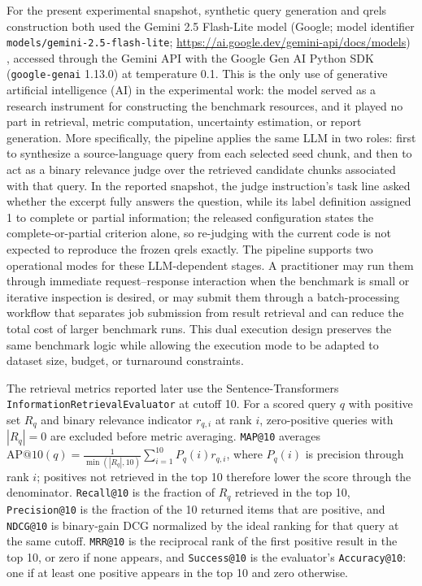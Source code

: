 For the present experimental snapshot, synthetic query generation and qrels construction both used the Gemini 2.5 Flash-Lite model (Google; model identifier \texttt{models/gemini-2.5-flash-lite}; \url{https://ai.google.dev/gemini-api/docs/models}) \citep{Google_Gemini25FlashLite}, accessed through the Gemini API with the Google Gen AI Python SDK (\texttt{google-genai} 1.13.0) at temperature 0.1. This is the only use of generative artificial intelligence (AI) in the experimental work: the model served as a research instrument for constructing the benchmark resources, and it played no part in retrieval, metric computation, uncertainty estimation, or report generation. More specifically, the pipeline applies the same LLM in two roles: first to synthesize a source-language query from each selected seed chunk, and then to act as a binary relevance judge over the retrieved candidate chunks associated with that query. In the reported snapshot, the judge instruction's task line asked whether the excerpt fully answers the question, while its label definition assigned 1 to complete or partial information; the released configuration states the complete-or-partial criterion alone, so re-judging with the current code is not expected to reproduce the frozen qrels exactly. The pipeline supports two operational modes for these LLM-dependent stages. A practitioner may run them through immediate request--response interaction when the benchmark is small or iterative inspection is desired, or may submit them through a batch-processing workflow that separates job submission from result retrieval and can reduce the total cost of larger benchmark runs. This dual execution design preserves the same benchmark logic while allowing the execution mode to be adapted to dataset size, budget, or turnaround constraints.

The retrieval metrics reported later use the Sentence-Transformers \texttt{Information\allowbreak RetrievalEvaluator} at cutoff 10. For a scored query $q$ with positive set $R_q$ and binary relevance indicator $r_{q,i}$ at rank $i$, zero-positive queries with $|R_q|=0$ are excluded before metric averaging. \texttt{MAP@10} averages $\mathrm{AP@10}(q)=\frac{1}{\min(|R_q|,10)}\sum_{i=1}^{10}P_q(i)r_{q,i}$, where $P_q(i)$ is precision through rank $i$; positives not retrieved in the top 10 therefore lower the score through the denominator. \texttt{Recall@10} is the fraction of $R_q$ retrieved in the top 10, \texttt{Precision@10} is the fraction of the 10 returned items that are positive, and \texttt{NDCG@10} is binary-gain DCG normalized by the ideal ranking for that query at the same cutoff. \texttt{MRR@10} is the reciprocal rank of the first positive result in the top 10, or zero if none appears, and \texttt{Success@10} is the evaluator's \texttt{Accuracy@10}: one if at least one positive appears in the top 10 and zero otherwise.

